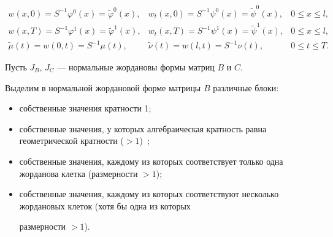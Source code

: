 \begin{equation}


\begin{array}{lcl}

w(x,0)=S^{-1}{\varphi}^0(x)=\tilde{\varphi}^0(x), & w_t(x,0)=S^{-1}\psi^0(x)=\tilde{\psi}^0(x),& 0\leq{x}\leq{l},\\




w(x,T)=S^{-1}\varphi^1(x)=\tilde{\varphi}^1(x),& w_t(x,T)=S^{-1}\psi^1(x)=\tilde{\psi}^1(x), & 0\leq{x}\leq{l},\\



\tilde{\mu}(t)=w(0,t)=S^{-1}\mu(t), & \tilde{\nu}(t)=w(l,t)=S^{-1}\nu(t), & 0\leq{t}\leq{T}.

\end{array}

\end{equation}



Пусть $J_B$, $J_C$ --- нормальные жордановы формы матриц $B$ и $C$.

Выделим в нормальной жордановой форме матрицы $B$ различные блоки:

\begin{itemize}

\item[1)] собственные значения кратности 1;



\item[2)] собственные значения, у которых алгебраическая кратность равна геометрической кратности ($>1$)~\cite{kozlova:bib:Gantmaher};



\item[3)] собственные значения, каждому из которых соответствует только одна жорданова клетка (размерности $>1$);



\item[4)] собственные значения, каждому из которых соответствуют несколько жордановых клеток (хотя бы одна из которых

размерности $>1$).

\end{itemize}



